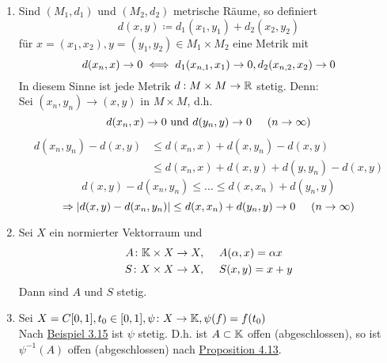 \begin{beispiel}
	\begin{enumerate}[label=\alph*\upshape)]
		\item Sind $(M_{1}, d_{1})$ und $(M_{2}, d_{2})$ metrische Räume, so definiert
				\[ d(x, y) \coloneqq d_{1}(x_{1}, y_{1}) + d_{2}(x_{2}, y_{2}) \]
			für $x = (x_{1}, x_{2}), y = (y_{1}, y_{2}) \in M_{1} \times M_{2}$ eine Metrik mit
			\[ d(x_{n}, x) \rightarrow 0 \iff d_{1}(x_{n,1}, x_{1}) \rightarrow 0, d_{2}(x_{n,2}, x_{2}) \rightarrow 0 \]
			In diesem Sinne ist jede Metrik $d: M \times M \rightarrow \mathbb{R}$ stetig. Denn: \\
			Sei $(x_{n}, y_{n}) \rightarrow (x, y)$ in $M \times M$, d.h.
			\[ d(x_{n}, x) \rightarrow 0 \text{ und } d(y_{n}, y) \rightarrow 0 \hspace{0.5cm} (n \rightarrow \infty) \]
			\begin{align*}
				 d(x_{n}, y_{n}) - d(x, y) & \leq d(x_{n}, x) + d(x, y_{n}) - d(x, y) \\
										  & \leq d(x_{n}, x) + d(x, y) + d(y, y_{n}) - d(x, y) 		
			\end{align*}
			\[ d(x, y)- d(x_{n}, y_{n}) \leq \dotsc \leq d(x, x_{n}) + d(y_{n}, y) \]
			\[ \Rightarrow | d(x, y) - d(x_{n}, y_{n}) | \leq d(x, x_{n}) + d(y_{n}, y) \rightarrow 0 \hspace{0.5cm} (n \rightarrow \infty) \]
		\item Sei $X$ ein normierter Vektorraum und
			\begin{align*}
				A \colon \mathbb{K} \times X \rightarrow X, & \hspace{0.5cm} A( \alpha, x) = \alpha x \\
				S \colon X \times X \rightarrow X, & \hspace{0.5cm} S(x, y) = x + y
			\end{align*}
			Dann sind $A$ und $S$ stetig.
		\item Sei $X = C[0, 1], t_{0} \in [0, 1], \psi \colon X \rightarrow \mathbb{K}, \psi(f) = f(t_{0})$ \\
		Nach \hyperref[bsp:1-3.15]{Beispiel 3.15} ist $\psi$ stetig. D.h. ist $A \subset \mathbb{K}$ offen (abgeschlossen), so ist $\psi^{-1}(A)$ offen (abgeschlossen) nach \hyperref[prop:4.13]{Proposition 4.13}.
	\end{enumerate}	
\end{beispiel}



\newpage